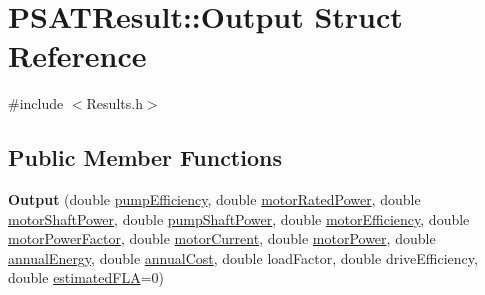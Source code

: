 \hypertarget{struct_p_s_a_t_result_1_1_output}{}\section{P\+S\+A\+T\+Result\+:\+:Output Struct Reference}
\label{struct_p_s_a_t_result_1_1_output}


{\ttfamily \#include $<$Results.\+h$>$}

\subsection*{Public Member Functions}
\begin{DoxyCompactItemize}
\item 
\mbox{\label{struct_p_s_a_t_result_1_1_output_a58fc8af1d1293208a5aa0750289c9de4}} 
{\bfseries Output} (double \hyperlink{struct_p_s_a_t_result_1_1_output_ab8ba6270cd9f0da55dfbb4fdb8d5b452}{pump\+Efficiency}, double \hyperlink{struct_p_s_a_t_result_1_1_output_a72f4e093c7cd3ee1ea943cebd79c2d7a}{motor\+Rated\+Power}, double \hyperlink{struct_p_s_a_t_result_1_1_output_a813a97afcb5ea5465d8b733eaa4f834c}{motor\+Shaft\+Power}, double \hyperlink{struct_p_s_a_t_result_1_1_output_a4b3231e19e5c472035276f46826d5143}{pump\+Shaft\+Power}, double \hyperlink{struct_p_s_a_t_result_1_1_output_ad1beb6e9a1fc9bc21c50eb42ae598589}{motor\+Efficiency}, double \hyperlink{struct_p_s_a_t_result_1_1_output_a4e99d794b66677cc0329f47a100d251a}{motor\+Power\+Factor}, double \hyperlink{struct_p_s_a_t_result_1_1_output_a90611798efa48c24155f6c957683d3a8}{motor\+Current}, double \hyperlink{struct_p_s_a_t_result_1_1_output_a531700e73ed9cc95d1dd4b2d58030ffb}{motor\+Power}, double \hyperlink{struct_p_s_a_t_result_1_1_output_aa5c429ca2975c3222ed79e3847d1bf09}{annual\+Energy}, double \hyperlink{struct_p_s_a_t_result_1_1_output_a222e9c8df8c99f87abe372cad138d5f4}{annual\+Cost}, double load\+Factor, double drive\+Efficiency, double \hyperlink{struct_p_s_a_t_result_1_1_output_af1d2f5dce8902351c00cdc2d5da0e34c}{estimated\+F\+LA}=0)
\item 
\mbox{\label{struct_p_s_a_t_result_1_1_output_a58fc8af1d1293208a5aa0750289c9de4}} 

\end{DoxyCompactItemize}
